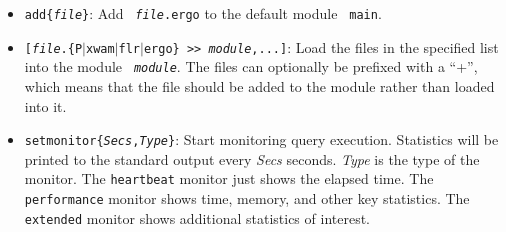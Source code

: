 \documentclass[11pt]{article}
\newcommand{\ergoext}{ergo\xspace}
\newcommand{\ofile}{xwam}
\begin{document}
\begin{itemize}
{    add\{\textnormal{\emph{file}}>{}>\textnormal{\emph{module}}\}}: Add
  {\tt \textnormal{\emph{file}}.\ergoext} to the module {\tt
    \textnormal{\emph{module}}}.
\item {\tt add\{\textnormal{\emph{file}}\}}: Add {\tt
    \textnormal{\emph{file}}.\ergoext} to the default module {\tt
    main}. 
\item {\tt [\textnormal{\emph{file}}.\{P$|$\ofile$|$flr$|$ergo\} \texttt{>{}>} 
    \textnormal{\emph{module}},...]}:
    Load the files in the specified list into the module {\tt
      \textnormal{\emph{module}}}.
    The files can optionally be prefixed with a ``+'', which means that the
    file should be added to the module rather than loaded into it.
\item {\tt setmonitor\{\textnormal{\emph{Secs}},\textnormal{\emph{Type}}\}}:
  Start monitoring query execution. Statistics will be printed to the
  standard output every \textit{Secs} seconds. \textit{Type} is the type of
  the monitor. The \texttt{heartbeat} monitor just shows the elapsed time.
  The \texttt{performance} monitor shows time, memory, and other
  key statistics. The \texttt{extended} monitor shows additional
  statistics of interest.


\end{itemize}
\end{document}
